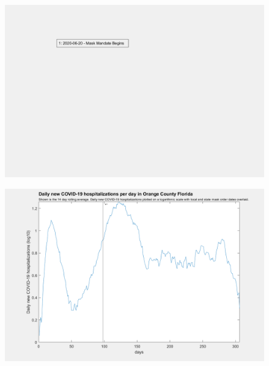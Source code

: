 \documentclass[]{article}
\begin{document}
\begin{figure}[!h]
	\includegraphics[width=\linewidth]{legends/orange_mask_order_legend.png}
	\caption{}
	\label{fig:legends/orange_mask_order_legendLabel}
\end{figure}

\begin{figure}[!h]
	\includegraphics[width=\linewidth]{images/orange_mask_order_hospitalizations_log.png}
	\caption{}
	\label{fig:images/orange_mask_order_hospitalizations_logLabel}
\end{figure}
\end{document}
